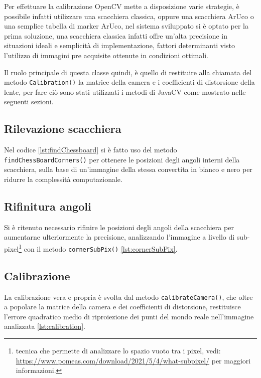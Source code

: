 \documentclass[12pt,a4paper,openright,twoside]{book}
\begin{document}
Per effettuare la calibrazione OpenCV mette a disposizione varie strategie, è possibile infatti utilizzare una scacchiera classica, oppure una scacchiera ArUco o una semplice tabella di marker ArUco, nel sistema sviluppato si è optato per la prima soluzione, una scacchiera classica infatti offre un'alta precisione in situazioni ideali e semplicità di implementazione, fattori determinanti visto l'utilizzo di immagini pre acquisite ottenute in condizioni ottimali.

Il ruolo principale di questa classe quindi, è quello di restituire alla chiamata del metodo \texttt{Calibration()} la matrice della camera e i coefficienti di distorsione della lente, per fare ciò sono stati utilizzati i metodi di JavaCV come mostrato nelle seguenti sezioni.

\subsection{Rilevazione scacchiera}
Nel codice \cref{lst:findChessboard} si è fatto uso del metodo \texttt{findChessBoardCorners()} per ottenere le posizioni degli angoli interni della scacchiera, sulla base di un'immagine della stessa convertita in bianco e nero per ridurre la complessità computazionale.
	
\subsection{Rifinitura angoli}
Si è ritenuto necessario rifinire le posizioni degli angoli della scacchiera per aumentarne ulteriormente la precisione, analizzando l'immagine a livello di sub-pixel\footnote{tecnica che permette di analizzare lo spazio vuoto tra i pixel, vedi: \url{https://www.pomeas.com/download/2021/5/4/what-subpixel/} per maggiori informazioni.} con il metodo \texttt{cornerSubPix()} \cref{lst:cornerSubPix}.

\subsection{Calibrazione}
La calibrazione vera e propria è svolta dal metodo \texttt{calibrateCamera()}, che oltre a popolare la matrice della camera e dei coefficienti di distorsione, restituisce l'errore quadratico medio di riproiezione dei punti del mondo reale nell'immagine analizzata \cref{lst:calibration}.

\end{document}
